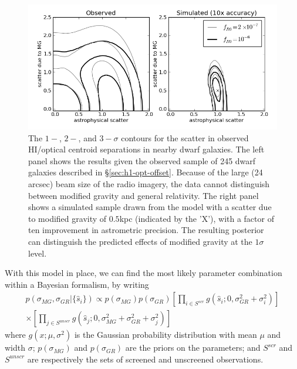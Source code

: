 \documentclass[useAMS,usenatbib,twocolumn]{mn2e}
\begin{document}
\begin{figure}
\centering
\includegraphics[scale=0.7]{figures/Offset_HI_optical_jake.png}
\caption{The $1-$, $2-$, and $3-\sigma$ contours for the scatter in observed
  HI/optical centroid separations in nearby dwarf galaxies.  The left panel
  shows the results given the observed sample of 245 dwarf galaxies described
  in \S\ref{sec:h1-opt-offset}.  Because of the large (24 arcsec) beam size of
  the radio imagery, the data cannot distinguish between modified gravity and
  general relativity.  The right panel shows a simulated sample drawn from the
  model with a scatter due to modified gravity of $0.5$kpc (indicated by the
'X'), %
  with a factor of ten improvement in astrometric precision.  The resulting
  posterior can distinguish the predicted effects of modified gravity at the
  $1\sigma$ level.}
\label{fig:offset-analysis}
\end{figure}

With this model in place, we can find the most likely parameter combination
within a Bayesian formalism, by writing
\begin{equation}
\begin{split}
  \label{eq:separation_likelihood}
  p(\sigma_{MG}, \sigma_{GR}|\{\hat{s}_i\})
  \propto p(\sigma_{MG})p(\sigma_{GR})
  \left[ \prod_{i \in S^{scr}} g(\hat{s}_i;0, \sigma_{GR}^2 +
\sigma_i^2)\right]\\
\times
  \left[ \prod_{j \in S^{unscr}} g(\hat{s}_j;0, \sigma_{MG}^2 +
\sigma_{GR}^2 + \sigma_j^2)\right]
\end{split}
\end{equation}
where $g(x;\mu,\sigma^2)$ is the Gaussian probability distribution with
mean $\mu$ and width $\sigma$; $p(\sigma_{MG})$ and $p(\sigma_{GR})$ are the
priors on the parameters; and $S^{scr}$ and $S^{unscr}$ are respectively the
sets of screened and unscreened observations.
\end{document}
